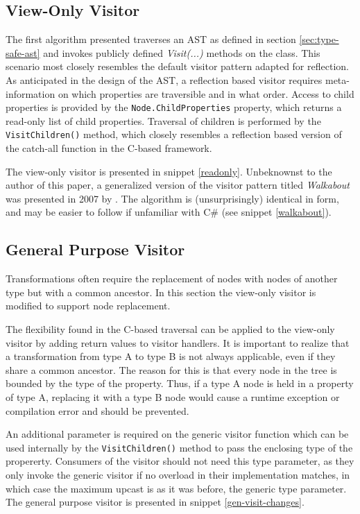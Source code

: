 \documentclass[twoside,openright]{uva-bachelor-thesis}
\newcommand{\code}[1]{\texttt{\footnotesize#1}}
\begin{document}
		\subsection{View-Only Visitor}
			The first algorithm presented traverses an AST as defined in section \ref{sec:type-safe-ast} and invokes publicly defined \emph{Visit(...)} methods on the class. This scenario most closely resembles the default visitor pattern adapted for reflection. As anticipated in the design of the AST, a reflection based visitor requires meta-information on which properties are traversible and in what order. Access to child properties is provided by the \code{Node.ChildProperties} property, which returns a read-only list of child properties. Traversal of children is performed by the \code{VisitChildren()} method, which closely resembles a reflection based version of the catch-all function in the C-based framework. 
			
			The view-only visitor is presented in snippet \ref{readonly}. Unbeknownst to the author of this paper, a generalized version of the visitor pattern titled \emph{Walkabout} was presented in 2007 by \citeauthor{palsberg1998essence}. The algorithm is (unsurprisingly) identical in form, and may be easier to follow if unfamiliar with C\# (see snippet \ref{walkabout}).
		
		\subsection{General Purpose Visitor}
			Transformations often require the replacement of nodes with nodes of another type but with a common ancestor. In this section the view-only visitor is modified to support node replacement.
			
			The flexibility found in the C-based traversal can be applied to the view-only visitor by adding return values to visitor handlers. It is important to realize that a transformation from type A to type B is not always applicable, even if they share a common ancestor. The reason for this is that every node in the tree is bounded by the type of the property. Thus, if a type A node is held in a property of type A, replacing it with a type B node would cause a runtime exception or compilation error and should be prevented.
			
			An additional parameter is required on the generic visitor function which can be used internally by the  \code{VisitChildren()} method to pass the enclosing type of the propererty. Consumers of the visitor should not need this type parameter, as they only invoke the generic visitor if no overload in their implementation matches, in which case the maximum upcast is as it was before, the generic type parameter. The general purpose visitor is presented in snippet \ref{gen-visit-changes}.
			
\end{document}

